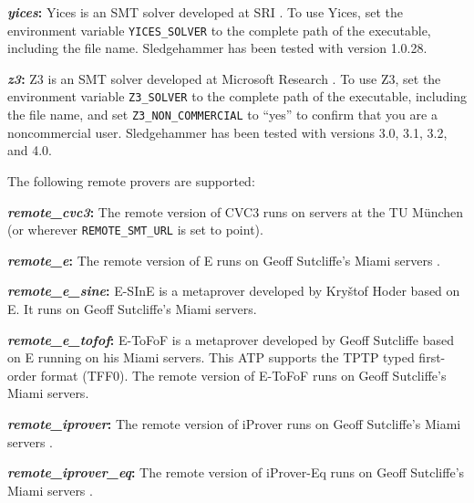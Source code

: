 \documentclass[a4paper,12pt]{article}
\begin{document}
\begin{enum}
\begin{sloppy}
\begin{enum}
\item[\labelitemi] \textbf{\textit{yices}:} Yices is an SMT solver developed at
SRI \cite{yices}. To use Yices, set the environment variable
\texttt{YICES\_SOLVER} to the complete path of the executable, including the
file name. Sledgehammer has been tested with version 1.0.28.

\item[\labelitemi] \textbf{\textit{z3}:} Z3 is an SMT solver developed at
Microsoft Research \cite{z3}. To use Z3, set the environment variable
\texttt{Z3\_SOLVER} to the complete path of the executable, including the file
name, and set \texttt{Z3\_NON\_COMMERCIAL} to ``yes'' to confirm that you are a
noncommercial user. Sledgehammer has been tested with versions 3.0, 3.1, 3.2,
and 4.0.
\end{enum}
\end{sloppy}

The following remote provers are supported:

\begin{enum}
\item[\labelitemi] \textbf{\textit{remote\_cvc3}:} The remote version of CVC3 runs
on servers at the TU M\"unchen (or wherever \texttt{REMOTE\_SMT\_URL} is set to
point).

\item[\labelitemi] \textbf{\textit{remote\_e}:} The remote version of E runs
on Geoff Sutcliffe's Miami servers \cite{sutcliffe-2000}.

\item[\labelitemi] \textbf{\textit{remote\_e\_sine}:} E-SInE is a metaprover
developed by Kry\v stof Hoder \cite{sine} based on E. It runs on Geoff
Sutcliffe's Miami servers.

\item[\labelitemi] \textbf{\textit{remote\_e\_tofof}:} E-ToFoF is a metaprover
developed by Geoff Sutcliffe \cite{tofof} based on E running on his Miami
servers. This ATP supports the TPTP typed first-order format (TFF0). The
remote version of E-ToFoF runs on Geoff Sutcliffe's Miami servers.

\item[\labelitemi] \textbf{\textit{remote\_iprover}:} The
remote version of iProver runs on Geoff Sutcliffe's Miami servers
\cite{sutcliffe-2000}.

\item[\labelitemi] \textbf{\textit{remote\_iprover\_eq}:} The
remote version of iProver-Eq runs on Geoff Sutcliffe's Miami servers
\cite{sutcliffe-2000}.


\end{enum}
\end{enum}
\end{document}
